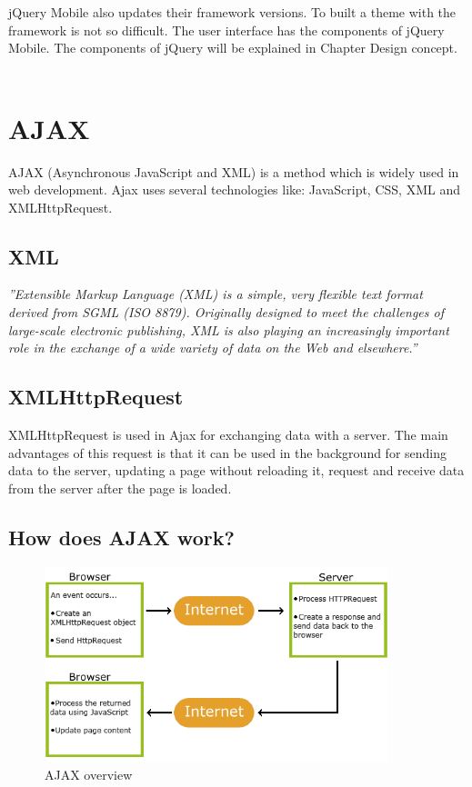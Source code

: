   jQuery Mobile  also updates their framework versions. To built a theme with the framework is not so difficult. The user interface has the components of jQuery Mobile. The components of jQuery will be explained in Chapter Design concept.\\\\
  
  \section {AJAX}
  AJAX (Asynchronous JavaScript and XML) is a method which is widely used in web development. Ajax uses several technologies like: JavaScript, CSS, XML and XMLHttpRequest.\cite{ajax}
  \\
  \subsection{XML}
  \textit{''Extensible Markup Language (XML) is a simple, very flexible text format derived from SGML (ISO 8879). Originally designed to meet the challenges of large-scale electronic publishing, XML is also playing an increasingly important role in the exchange of a wide variety of data on the Web and elsewhere.''}\cite{xml}
  \\
  \subsection{XMLHttpRequest}
  XMLHttpRequest is used in Ajax for exchanging data with a server. The main advantages of this request is that it can be used in the background for sending data to the server, updating a page without reloading it, request and receive data from the server after the page is loaded.\cite{xmlHttp} 
  \newpage
  \subsection{How does AJAX work?}
  \begin{figure}[htbp]
  \centering
  \includegraphics[width=100mm,height=\textheight,keepaspectratio]{graphics/ajaxwork.png}
  \caption{AJAX overview\cite{ajax}}
  \end{figure}
  
